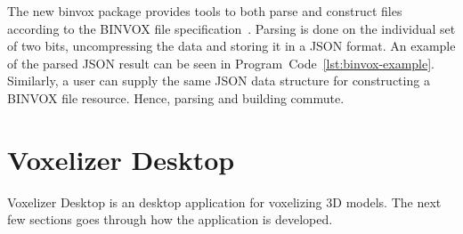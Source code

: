 The new binvox package provides tools to both parse and construct files according to the BINVOX file specification~\cite{binvox-file-format}. Parsing is done on the individual set of two bits, uncompressing the data and storing it in a JSON format. An example of the parsed JSON result can be seen in Program~Code~\ref{lst:binvox-example}. Similarly, a user can supply the same JSON data structure for constructing a BINVOX file resource. Hence, parsing and building commute.


\section{Voxelizer Desktop}
Voxelizer Desktop is an desktop application for voxelizing 3D models. The next few sections goes through how the application is developed.

